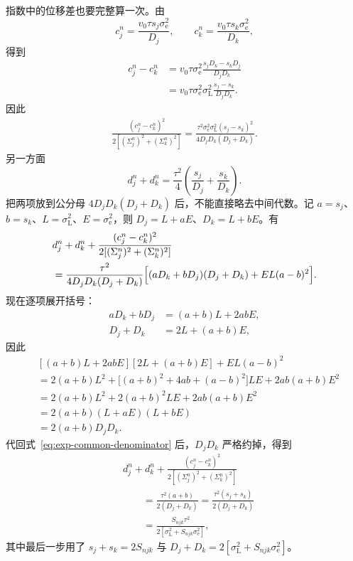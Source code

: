指数中的位移差也要完整算一次。由
\[
c_j^n=\frac{v_0\tau s_j\sigma_{\mathrm e}^2}{D_j},
\qquad
c_k^n=\frac{v_0\tau s_k\sigma_{\mathrm e}^2}{D_k},
\]
得到
\begin{align}
c_j^n-c_k^n
&=v_0\tau\sigma_{\mathrm e}^2
\frac{s_jD_k-s_kD_j}{D_jD_k}\\
&=v_0\tau\sigma_{\mathrm e}^2\sigma_{\mathrm L}^2
\frac{s_j-s_k}{D_jD_k}.
\end{align}
因此
\begin{align}
\frac{(c_j^n-c_k^n)^2}{2[(\Sigma_j^n)^2+(\Sigma_k^n)^2]}
=\frac{\tau^2\sigma_{\mathrm e}^2\sigma_{\mathrm L}^2(s_j-s_k)^2}
{4D_jD_k(D_j+D_k)}.
\end{align}
另一方面
\begin{equation}
d_j^n+d_k^n
=\frac{\tau^2}{4}
\left(\frac{s_j}{D_j}+\frac{s_k}{D_k}\right).
\end{equation}
把两项放到公分母 $4D_jD_k(D_j+D_k)$ 后，不能直接略去中间代数。记 $a=s_j$、$b=s_k$、$L=\sigma_{\mathrm L}^2$、$E=\sigma_{\mathrm e}^2$，则 $D_j=L+aE$、$D_k=L+bE$。有
\begin{align}
&d_j^n+d_k^n+
\frac{(c_j^n-c_k^n)^2}{2[(\Sigma_j^n)^2+(\Sigma_k^n)^2]}\\
&=\frac{\tau^2}{4D_jD_k(D_j+D_k)}
\Bigl[(aD_k+bD_j)(D_j+D_k)+EL(a-b)^2\Bigr].
\label{eq:exp-common-denominator}
\end{align}
现在逐项展开括号：
\begin{align}
aD_k+bD_j&=(a+b)L+2abE,\\
D_j+D_k&=2L+(a+b)E,
\end{align}
因此
\begin{align}
&[(a+b)L+2abE][2L+(a+b)E]+EL(a-b)^2\\
&=2(a+b)L^2
+\bigl[(a+b)^2+4ab+(a-b)^2\bigr]LE
+2ab(a+b)E^2\\
&=2(a+b)L^2+2(a+b)^2LE+2ab(a+b)E^2\\
&=2(a+b)(L+aE)(L+bE)\\
&=2(a+b)D_jD_k.
\end{align}
代回式~\eqref{eq:exp-common-denominator} 后，$D_jD_k$ 严格约掉，得到
\begin{align}
&d_j^n+d_k^n+
\frac{(c_j^n-c_k^n)^2}{2[(\Sigma_j^n)^2+(\Sigma_k^n)^2]}\\
&\qquad=
\frac{\tau^2(a+b)}{2(D_j+D_k)}
=\frac{\tau^2(s_j+s_k)}{2(D_j+D_k)}\\
&\qquad=\frac{S_{njk}\tau^2}
{2[\sigma_{\mathrm L}^2+S_{njk}\sigma_{\mathrm e}^2]},
\end{align}
其中最后一步用了 $s_j+s_k=2S_{njk}$ 与 $D_j+D_k=2[\sigma_{\mathrm L}^2+S_{njk}\sigma_{\mathrm e}^2]$。
